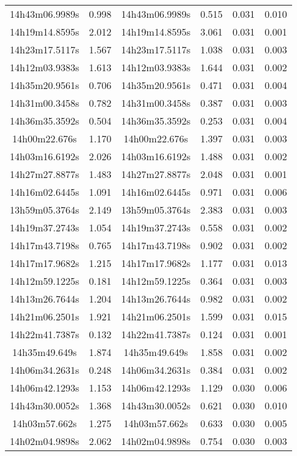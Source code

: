 \begin{table}
\begin{tabular}{cccccc}
14h43m06.9989s & 0.998 & 14h43m06.9989s & 0.515 & 0.031 & 0.010 \\
14h19m14.8595s & 2.012 & 14h19m14.8595s & 3.061 & 0.031 & 0.001 \\
14h23m17.5117s & 1.567 & 14h23m17.5117s & 1.038 & 0.031 & 0.003 \\
14h12m03.9383s & 1.613 & 14h12m03.9383s & 1.644 & 0.031 & 0.002 \\
14h35m20.9561s & 0.706 & 14h35m20.9561s & 0.471 & 0.031 & 0.004 \\
14h31m00.3458s & 0.782 & 14h31m00.3458s & 0.387 & 0.031 & 0.003 \\
14h36m35.3592s & 0.504 & 14h36m35.3592s & 0.253 & 0.031 & 0.004 \\
14h00m22.676s & 1.170 & 14h00m22.676s & 1.397 & 0.031 & 0.003 \\
14h03m16.6192s & 2.026 & 14h03m16.6192s & 1.488 & 0.031 & 0.002 \\
14h27m27.8877s & 1.483 & 14h27m27.8877s & 2.048 & 0.031 & 0.001 \\
14h16m02.6445s & 1.091 & 14h16m02.6445s & 0.971 & 0.031 & 0.006 \\
13h59m05.3764s & 2.149 & 13h59m05.3764s & 2.383 & 0.031 & 0.003 \\
14h19m37.2743s & 1.054 & 14h19m37.2743s & 0.558 & 0.031 & 0.002 \\
14h17m43.7198s & 0.765 & 14h17m43.7198s & 0.902 & 0.031 & 0.002 \\
14h17m17.9682s & 1.215 & 14h17m17.9682s & 1.177 & 0.031 & 0.013 \\
14h12m59.1225s & 0.181 & 14h12m59.1225s & 0.364 & 0.031 & 0.003 \\
14h13m26.7644s & 1.204 & 14h13m26.7644s & 0.982 & 0.031 & 0.002 \\
14h21m06.2501s & 1.921 & 14h21m06.2501s & 1.599 & 0.031 & 0.015 \\
14h22m41.7387s & 0.132 & 14h22m41.7387s & 0.124 & 0.031 & 0.001 \\
14h35m49.649s & 1.874 & 14h35m49.649s & 1.858 & 0.031 & 0.002 \\
14h06m34.2631s & 0.248 & 14h06m34.2631s & 0.384 & 0.031 & 0.002 \\
14h06m42.1293s & 1.153 & 14h06m42.1293s & 1.129 & 0.030 & 0.006 \\
14h43m30.0052s & 1.368 & 14h43m30.0052s & 0.621 & 0.030 & 0.010 \\
14h03m57.662s & 1.275 & 14h03m57.662s & 0.633 & 0.030 & 0.005 \\
14h02m04.9898s & 2.062 & 14h02m04.9898s & 0.754 & 0.030 & 0.003 \\

\end{tabular}
\end{table}
